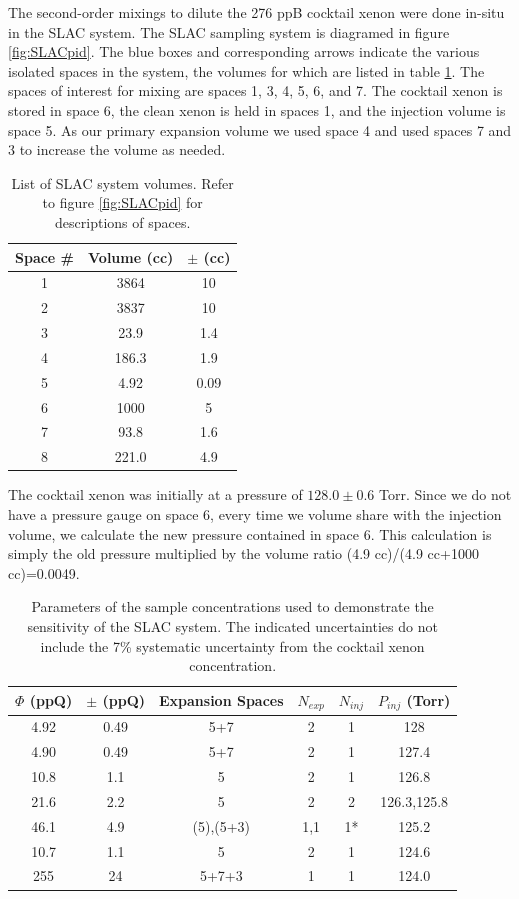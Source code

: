 The second-order mixings to dilute the 276 ppB cocktail xenon were done in-situ in the SLAC system. The SLAC sampling system is diagramed in figure \ref{fig:SLACpid}. The blue boxes and corresponding arrows indicate the various isolated spaces in the system, the volumes for which are listed in table \ref{tab:SLACvols}. The spaces of interest for mixing are spaces 1, 3, 4, 5, 6, and 7. The cocktail xenon is stored in space 6, the clean xenon is held in spaces 1, and the injection volume is space 5. As our primary expansion volume we used space 4 and used spaces 7 and 3 to increase the volume as needed.
\begin{table}[h!]
\centering
 \begin{tabular}{ c | c | c }
 \hline
 \hline
 Space \# & Volume (cc) & $\pm$ (cc) \\ 
 \hline\hline
1 & 3864 & 10 \\ 
2 & 3837 & 10 \\
3 & 23.9 & 1.4 \\
4 & 186.3 &1.9 \\
5 & 4.92 & 0.09 \\
6 & 1000 & 5 \\
7 & 93.8 & 1.6 \\
8 & 221.0 & 4.9 \\
 \hline
 \hline
\end{tabular}
\caption{List of SLAC system volumes. Refer to figure \ref{fig:SLACpid} for descriptions of spaces.}
\label{tab:SLACvols}
\end{table}

The cocktail xenon was initially at a pressure of $128.0\pm0.6$ Torr. Since we do not have a pressure gauge on space 6, every time we volume share with the injection volume, we calculate the new pressure contained in space 6. This calculation is simply the old pressure multiplied by the volume ratio (4.9 cc)/(4.9 cc+1000 cc)=0.0049.
 \begin{table}[h!]
 \centering
 \begin{tabular}{ c | c | c | c | c | c}
 \hline
 \hline
 $\Phi$ (ppQ) & $\pm$ (ppQ) &  Expansion Spaces & $N_{exp}$ & $N_{inj}$ & $P_{inj}$ (Torr) \\ 
 \hline
 \hline
4.92 & 0.49 & 5+7 & 2 & 1 & 128 \\ 
4.90 & 0.49 & 5+7 & 2 & 1 & 127.4 \\ 
10.8 & 1.1 & 5 & 2 & 1 &126.8 \\
21.6 & 2.2 & 5 & 2 & 2 & 126.3,125.8 \\
46.1 & 4.9 & (5),(5+3) & 1,1 & 1* & 125.2 \\
10.7 & 1.1 & 5 & 2 & 1 & 124.6 \\
255 & 24 & 5+7+3 & 1 & 1 & 124.0 \\
 \hline
 \hline
\end{tabular}
\caption{Parameters of the sample concentrations used to demonstrate the sensitivity of the SLAC system. The indicated uncertainties do not include the 7\% systematic uncertainty from the cocktail xenon concentration.}
\label{tab:concentrations}
\end{table}

